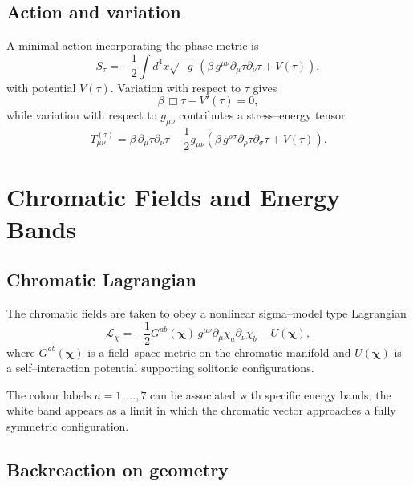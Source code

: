 \section{Action and variation}

A minimal action incorporating the phase metric is
\begin{equation}
  S_\tau = -\frac{1}{2} \int d^4x \sqrt{-g}\, \left( \beta\, g^{\mu\nu}\partial_\mu \tau \partial_\nu \tau + V(\tau) \right),
\end{equation}
with potential $V(\tau)$.
Variation with respect to $\tau$ gives
\begin{equation}
  \beta\, \Box \tau - V'(\tau) = 0,
\end{equation}
while variation with respect to $g_{\mu\nu}$ contributes a stress--energy tensor
\begin{equation}
  T^{(\tau)}_{\mu\nu}
  =
  \beta\, \partial_\mu \tau \partial_\nu \tau
  - \frac{1}{2} g_{\mu\nu}
  \left(
    \beta\, g^{\rho\sigma}\partial_\rho \tau \partial_\sigma \tau + V(\tau)
  \right).
\end{equation}

\chapter{Chromatic Fields and Energy Bands}

\section{Chromatic Lagrangian}

The chromatic fields are taken to obey a nonlinear sigma--model type Lagrangian
\begin{equation}
  \mathcal{L}_\chi
  =
  -\frac{1}{2} G^{ab}(\bm{\chi})\, g^{\mu\nu}\partial_\mu \chi_a \partial_\nu \chi_b
  - U(\bm{\chi}),
\end{equation}
where $G^{ab}(\bm{\chi})$ is a field--space metric on the chromatic manifold and $U(\bm{\chi})$ is a self--interaction potential supporting solitonic configurations.

The colour labels $a=1,\dots,7$ can be associated with specific energy bands; the white band appears as a limit in which the chromatic vector approaches a fully symmetric configuration.

\section{Backreaction on geometry}


